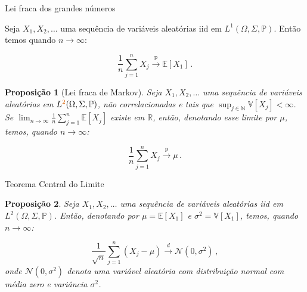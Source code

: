\documentclass[11pt]{beamer}
\newtheorem{proposition}{Proposição}
\begin{document}
		\begin{frame}{Lei fraca dos grandes números}
			\begin{corollary}
			Seja $X_1, X_2,\ldots$ uma sequência de variáveis aleatórias iid em $L^1(\Omega,\Sigma,\mathbb{P})$. Então temos quando $n \to \infty$:
			
			$$\frac{1}{n}\sum_{j=1}^n X_j \overset{\text{p}}{\to} \mathbb{E}[X_1]\, .$$
		\end{corollary}
		
					\begin{proposition}[Lei fraca de Markov]
			Seja $X_1, X_2,\ldots$ uma sequência de variáveis aleatórias em $L^{\color{red}2}(\Omega,\Sigma,\mathbb{P})$, não correlacionadas e tais que $\sup_{j \in \mathbb{N}}\mathbb{V}[X_j] <\infty$. Se $\lim_{n\to\infty} \frac{1}{n}\sum_{j=1}^n \mathbb{E}[X_j]$ existe em $\mathbb{R}$, então, denotando esse limite por $\mu$, temos, quando $n \to \infty$:
			 
		$$\frac{1}{n}\sum_{j=1}^n X_j \overset{\text{p}}{\to} \mu\, .$$
		\end{proposition}
	\end{frame}
		\begin{frame}{Teorema Central do Limite}
			\begin{proposition}
						Seja $X_1, X_2,\ldots$ uma sequência de variáveis aleatórias iid em $L^2(\Omega,\Sigma,\mathbb{P})$. Então, denotando por $\mu = \mathbb{E}[X_1]$ e $\sigma^2 = \mathbb{V}[X_1]$, temos, quando $n \to \infty$:
						
						
						$$\frac{1}{\sqrt{n}}\sum_{j=1}^n (X_j - \mu) \overset{d}{\to} \mathcal{N}(0,\sigma^2)\, , $$
						onde $\mathcal{N}(0,\sigma^2)$ denota uma variável aleatória com distribuição normal com média zero e variância $\sigma^2$.
			\end{proposition}

	\end{frame}
\end{document}
